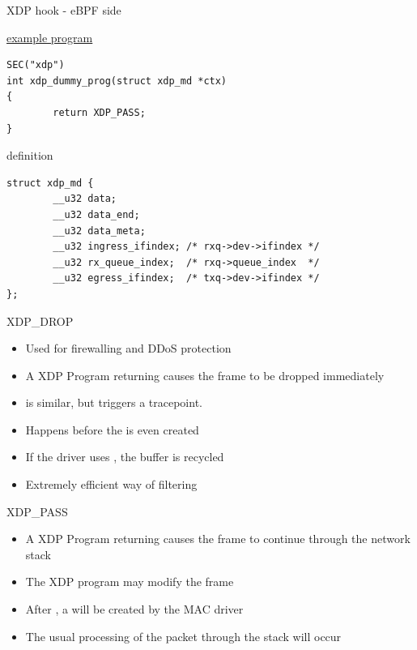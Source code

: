 \begin{frame}[fragile]{XDP hook - eBPF side}
	\begin{block}{\href{https://elixir.bootlin.com/linux/v6.12.32/source/tools/testing/selftests/bpf/progs/xdp_dummy.c}{example program}}
		{\fontsize{8}{9}
	\begin{verbatim}
SEC("xdp")
int xdp_dummy_prog(struct xdp_md *ctx)
{
        return XDP_PASS;
}
	\end{verbatim}
		}
	\end{block}
	\begin{block}{ definition}
		{\fontsize{8}{9}
	\begin{verbatim}
struct xdp_md {
        __u32 data;
        __u32 data_end;
        __u32 data_meta;
        __u32 ingress_ifindex; /* rxq->dev->ifindex */
        __u32 rx_queue_index;  /* rxq->queue_index  */
        __u32 egress_ifindex;  /* txq->dev->ifindex */
};
	\end{verbatim}
		}
	\end{block}

\end{frame}

\begin{frame}[fragile]{XDP\_DROP}
	\begin{itemize}
		\item Used for firewalling and DDoS protection
		\item A XDP Program returning  causes the frame to be dropped immediately
		\item {} is similar, but triggers a tracepoint.
		\item Happens before the  is even created
		\item If the driver uses , the buffer is recycled
		\item Extremely efficient way of filtering
	\end{itemize}
\end{frame}

\begin{frame}{XDP\_PASS}
	\begin{itemize}
		\item A XDP Program returning  causes the frame to continue through the network stack
		\item The XDP program may modify the frame
		\item After , a  will be created by the MAC driver
		\item The usual processing of the packet through the stack will occur
	\end{itemize}
\end{frame}

